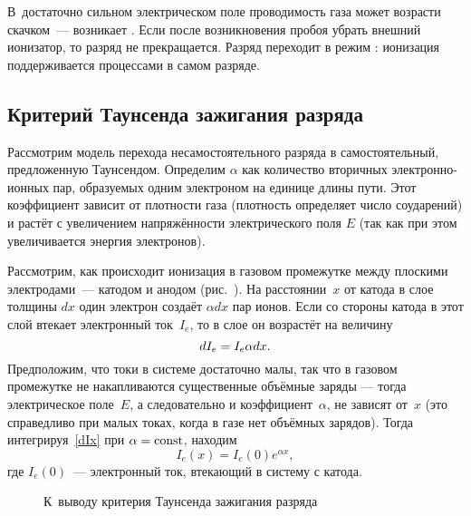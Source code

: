 \begin{labsupplement}
В~достаточно сильном электрическом поле проводимость газа может возрасти
скачком~--- возникает .
Если после возникновения пробоя убрать внешний ионизатор, то разряд не
прекращается. Разряд переходит в режим :
ионизация поддерживается процессами в самом разряде.

\subsection*{Критерий Таунсенда зажигания разряда}
Рассмотрим модель перехода несамостоятельного разряда в самостоятельный,
предложенную Таунсендом.
Определим  $\alpha$ как
количество вторичных электронно-ионных пар, образуемых одним электроном
на единице длины пути.
Этот коэффициент зависит от плотности газа
(плотность определяет число соударений)
и растёт с увеличением напряжённости электрического поля $E$
(так как при этом увеличивается энергия электронов).

Рассмотрим, как происходит ионизация в газовом промежутке между плоскими
электродами~--- катодом и анодом (рис.~). На
расстоянии~$x$ от катода в слое толщины $dx$ один электрон создаёт $\alpha dx$
пар ионов. Если со стороны катода в этот
слой втекает электронный ток~$I_e$, то в слое он возрастёт на величину
\begin{equation}
\eqmark{dIx}
dI_e=I_e\alpha dx.
\end{equation}
Предположим, что токи в системе достаточно малы, так что в газовом промежутке
не накапливаются существенные объёмные заряды --- тогда электрическое поле~$E$,
а следовательно и коэффициент~$\alpha$, не зависят от~$x$
(это справедливо при малых токах, когда в газе нет объёмных зарядов).
Тогда интегрируя~\eqref{dIx} при $\alpha=\mathrm{const}$, находим
\begin{equation*}
	I_e(x)=I_e(0)e^{\alpha x},
\end{equation*}
где $I_e(0)$~--- электронный ток, втекающий в систему с катода.

\begin{wrapfigure}{o}{0.3\textwidth}
    \centering
    \caption{К~выводу критерия Таунсенда зажигания разряда}
\end{wrapfigure}


\end{labsupplement}
